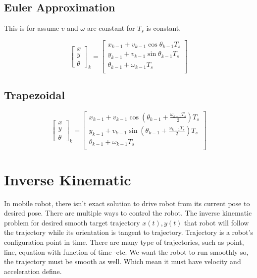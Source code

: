 \subsection{Euler Approximation}
This is for assume $v$ and $\omega$ are constant for $T_s$ is constant.
\begin{tcolorbox}[title=Euler Approximation Descretization]
\begin{equation}
	\begin{bmatrix}
		x      \\
		y      \\
		\theta 
	\end{bmatrix}_k=
	\begin{bmatrix}
		x_{k-1} + v_{k-1}\cos\theta_{k-1} T_s\\
		y_{k-1} + v_{k-1}\sin\theta_{k-1} T_s\\
		\theta_{k-1} + \omega_{k-1} T_s\\
	\end{bmatrix}
\end{equation}
\end{tcolorbox}

\subsection{Trapezoidal}
\begin{tcolorbox}[title=Trapezoidal Descretization]
\begin{equation}
	\begin{bmatrix}
		x      \\
		y      \\
		\theta 
	\end{bmatrix}_k=
	\begin{bmatrix}
		x_{k-1} + v_{k-1}\cos(\theta_{k-1}+\frac{\omega_{k-1}T_s}{2}) T_s\\
		y_{k-1} + v_{k-1}\sin(\theta_{k-1}+\frac{\omega_{k-1}T_s}{2}) T_s\\
		\theta_{k-1} + \omega_{k-1} T_s\\
	\end{bmatrix}
\end{equation}
\end{tcolorbox}


\section{Inverse Kinematic}
In mobile robot, there isn't exact solution to drive robot from its current pose to desired pose. There are multiple ways to control the robot. The inverse kinematic problem for desired smooth target trajectory $x(t), y(t)$ that robot will follow the trajectory while its orientation is tangent to trajectory. Trajectory is a robot's configuration point in time. There are many type of trajectories, such as point, line, equation with function of time -etc. We want the robot to run smoothly so, the trajectory must be smooth as well. Which mean it must have velocity and acceleration define.

